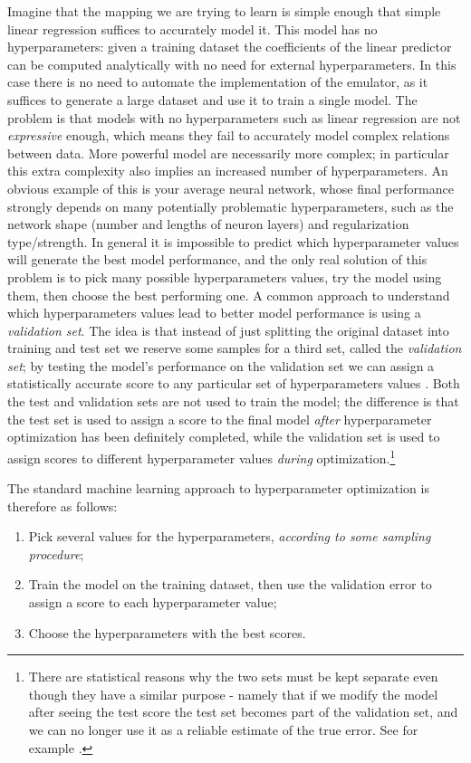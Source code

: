 Imagine that the mapping we are trying to learn is simple enough that simple linear regression suffices to accurately model it. This model has no hyperparameters: given a training dataset the coefficients of the linear predictor can be computed analytically with no need for external hyperparameters. In this case there is no need to automate the implementation of the emulator, as it suffices to generate a large dataset and use it to train a single model.
The problem is that models with no hyperparameters such as linear regression are not \emph{expressive} enough, which means they fail to accurately model complex relations between data. More powerful model are necessarily more complex; in particular this extra complexity also implies an increased number of hyperparameters. 
An obvious example of this is your average neural network, whose final performance strongly depends on many potentially problematic hyperparameters, such as the network shape (number and lengths of neuron layers) and regularization type/strength. In general it is impossible to predict which hyperparameter values will generate the best model performance, and the only real solution of this problem is to pick many possible hyperparameters values, try the model using them, then choose the best performing one.
A common approach to understand which hyperparameters values lead to better model performance is using a \emph{validation set}. The idea is that instead of just splitting the original dataset into training and test set we reserve some samples for a third set, called the \emph{validation set}; by testing the model's performance on the validation set we can assign a statistically accurate score to any particular set of hyperparameters values \cite{understanding_ml}. Both the test and validation sets are not used to train the model; the difference is that the test set is used to assign a score to the final model \emph{after} hyperparameter optimization has been definitely completed, while the validation set is used to assign scores to different hyperparameter values \emph{during} optimization.\footnote{There are statistical reasons why the two sets must be kept separate even though they have a similar purpose - namely that if we modify the model after seeing the test score the test set becomes part of the validation set, and we can no longer use it as a reliable estimate of the true error. See for example \cite{understanding_ml} \cite{ml_probabilistic_perspective}.}

The standard machine learning approach to hyperparameter optimization is therefore as follows:
\begin{enumerate}
    \item Pick several values for the hyperparameters, \emph{according to some sampling procedure};
    \item Train the model on the training dataset, then use the validation error to assign a score to each hyperparameter value;
    \item Choose the hyperparameters with the best scores.
\end{enumerate}

